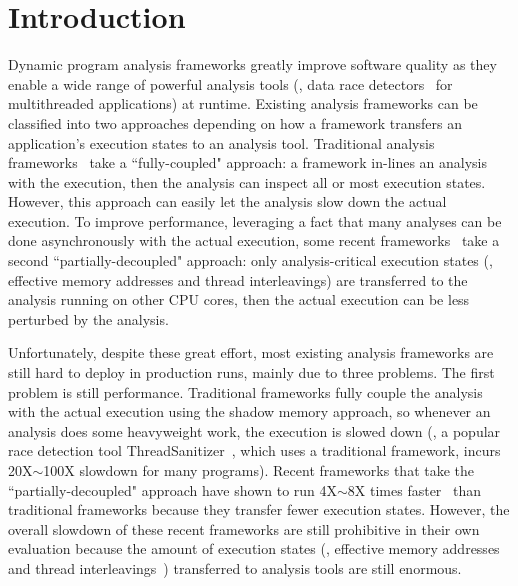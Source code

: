 \section{Introduction} \label{sec:intro}



Dynamic program analysis frameworks greatly improve software quality as they
enable a wide range of powerful analysis tools (\eg, data race
detectors~\cite{tsan, valgrind:pldi, wester:parallelizing:asplos13} for
multithreaded applications) at runtime. Existing analysis frameworks can be
classified into two approaches depending on how a framework transfers an
application's execution states to an analysis tool. Traditional analysis
frameworks~\cite{dynamorio, pin:pldi05, valgrind:pldi, lift:micro06, tsan} take
a ``fully-coupled" approach: a framework in-lines an analysis with the
execution, then the analysis can inspect all or most execution states. However,
this approach can easily let the analysis slow down the actual execution. To
improve performance, leveraging a fact that many analyses can be done
asynchronously with the actual execution, some recent
frameworks~\cite{decouple:usenix08, speck:asplos08, 
shadowreplica:ccs13, wester:parallelizing:asplos13, superpin, jungwoo:oopsla09}
take a second ``partially-decoupled" approach: only analysis-critical execution
states (\eg, effective memory addresses and thread interleavings) are
transferred to the analysis running on other CPU cores, then the actual execution
can be less perturbed by the analysis.




Unfortunately, despite these great effort, most existing analysis frameworks are
still hard to deploy in production runs, mainly due to three problems. The first
problem is still performance. Traditional frameworks fully couple the analysis
with the actual execution using the shadow memory approach, so whenever an
analysis does some heavyweight work, the execution is slowed down (\eg, a
popular race detection tool ThreadSanitizer~\cite{tsan}, which uses a
traditional framework, incurs 20X$\sim$100X slowdown for many programs). Recent
frameworks that take the ``partially-decoupled" approach have shown to run
4X$\sim$8X times faster~\cite{shadowreplica:ccs13,
wester:parallelizing:asplos13} than traditional frameworks because they transfer
fewer 
execution states. However, the overall slowdown of these recent frameworks are
still prohibitive in their own evaluation because the amount of execution states
(\eg, effective memory addresses~\cite{shadowreplica:ccs13} and thread
interleavings~\cite{wester:parallelizing:asplos13}) transferred to analysis tools
are still enormous.


